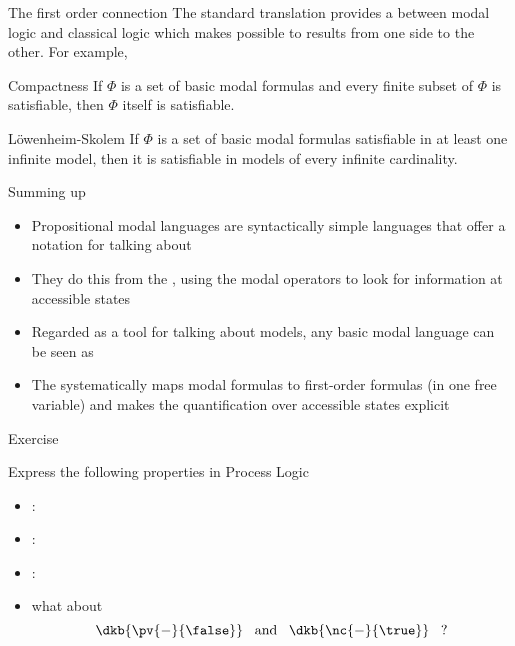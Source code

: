 \documentclass{beamer}
\begin{document}
\begin{slide}{The first order connection}\label{s:22}
\small
The standard translation provides a  between modal logic and classical logic
which makes possible to  results from one side to the other. For example,
\vspace{0.2cm}

\begin{block}{Compactness}
If $\Phi$ is a set of basic modal formulas and every finite subset of $\Phi$ is satisfiable, then $\Phi$ itself is satisfiable.
\end{block}

\begin{block}{L\"owenheim-Skolem}
If $\Phi$ is a set of basic modal formulas  satisfiable in at least one infinite model, then it is satisfiable in models of every infinite cardinality.
\end{block}
\end{slide}


\begin{slide}{Summing up}\label{s:23}
\small
\begin{itemize}
\item Propositional modal languages are syntactically simple languages that offer a  notation for talking about 
\item They do this from the , using the modal operators to look for information at accessible states
 \item Regarded as a tool for talking about models, any basic modal language can be seen as 
 \item The  systematically maps modal formulas to first-order formulas (in one free variable) and makes the quantification over accessible states explicit
\end{itemize}
\end{slide}



\begin{slide}{\red Exercise}\label{s:24}
\small
\begin{block}{Express the following properties in Process Logic}
\begin{itemize}
\item {}: 
\item {}: 
\item {}: 
\item what about
\begin{equation*}
\dkb{\pv{-}{\false}}\; \; \; \text{and}\; \; \;  \dkb{\nc{-}{\true}}\; \; \; \text{?}
\end{equation*}
 \end{itemize}
 \end{block}
\end{slide}
\end{document}

